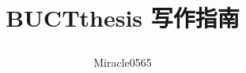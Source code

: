 
%

\newcommand{\addfig}[4][.5\textwidth]{%
	\begin{figure}[H]
		\centering
		\texttt{[image: \#2]}
		\caption{#3}\label{#4}
	\end{figure}}

\newcommand\Vector{\symbfit}
\newcommand\Matrix{\symbfit}


\title{BUCTthesis 写作指南\par\version}
\author{Miracle0565}


\RequirePackage{bxtexlogo}
\newcommand{\version}{Beta.v0.9.4}
\newcommand{\cmd}[1]{\texttt{\textbackslash#1}}
\newcommand{\file}{\textsf}
\newcommand{\pkg}{\textsf}
\newcommand{\env}{\texttt}
\newcommand{\opt}{\texttt}
\newcommand{\argu}[1]{\{$\langle$\textit{#1}$\rangle$\}}
\newcommand{\cargu}[1]{$\langle$\textit{#1}$\rangle$}
